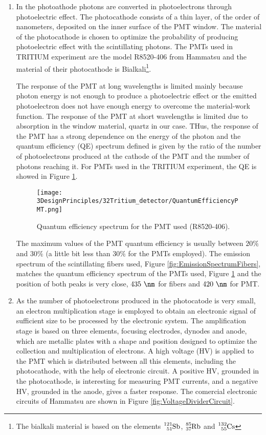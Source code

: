 \begin{enumerate}
\item{} In the photoathode photons are converted in photoelectrons through photoelectric effect. The photocathode consists of a thin layer, of the order of nanometers, deposited on the inner surface of the PMT window. The material of the photocathode is chosen to optimize the probability of producing photoelectric effect with the scintillating photons. The PMTs used in TRITIUM experiment are the model R8520-406 from Hammatsu \cite{DataSheetPMTs} and the material of their photocathode is Bialkali\footnote{The bialkali material is based on the elements $\ce{^{121}_{51}Sb}$, $\ce{^{85}_{37}Rb}$ and $\ce{^{132}_{55}Cs}$}.

The response of the PMT at long wavelengths is limited mainly because photon energy is not enough to produce a photoelectric effect or the emitted photoelectron does not have enough energy to overcome the material-work function. The response of the PMT at short wavelengths is limited due to absorption in the window material, quartz in our case. THus, the response of the PMT has a strong dependence on the energy of the photon and the quantum efficiency (QE)  spectrum defined is given by the ratio of the number of photoelectrons produced at the cathode of the PMT and the number of photons reaching it. For PMTs used in the TRITIUM experiment, the QE is showed in Figure \ref{fig:QuantumEfficiencyPMT}.

\begin{figure}[htbp]
\centering
\texttt{[image: 3DesignPrinciples/32Tritium\_detector/QuantumEfficiencyPMT.png]}
\caption{Quantum efficiency spectrum for the PMT used (R8520-406).\label{fig:QuantumEfficiencyPMT}~\cite{DataSheetPMTs}}
\end{figure}

The maximum values of the PMT quantum efficiency is usually between $20\%$ and $30\%$ \cite{Knoll} (a little bit less than $30\%$ for the PMTs employed). The emission spectrum of the scintillating fibers used, Figure \ref{fig:EmissionSpectrumFibers}, matches the quantum efficiency spectrum of the PMTs used, Figure \ref{fig:QuantumEfficiencyPMT} and the position of both peaks is very close, $435~\nm$ for fibers and $420~\nm$ for PMT.

\item{} As the number of photoelectrons produced in the photocatode is very small, an electron multiplication stage is employed to obtain an electronic signal of sufficient size to be processed by the electronic system. The amplification stage is based on three elements, focusing electrodes, dynodes and anode, which are metallic plates with a shape and position designed to optimize the collection and multiplication of electrons. A high voltage (HV) is applied to the PMT which is distributed between all this elements, including the photocathode, with the help of electronic circuit. A positive HV, grounded in the photocathode, is interesting for measuring PMT currents, and a negative HV, grounded in the anode, gives a faster response. The comercial electronic circuits of Hammatsu are shown in Figure \ref{fig:VoltageDividerCircuit}.


\end{enumerate}
